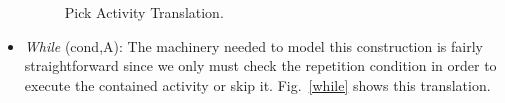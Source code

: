 \begin{itemize}
\begin{figure}[!ht]
\begin{center}
\end{center}
\caption{\label{pick} Pick Activity Translation.}
\end{figure}

\item {\it While} (cond,A): The machinery needed to model this construction is fairly straightforward since we only must check the repetition condition
in order to execute the contained activity or skip it. Fig.~\ref{while} shows this translation.
\end{itemize}

